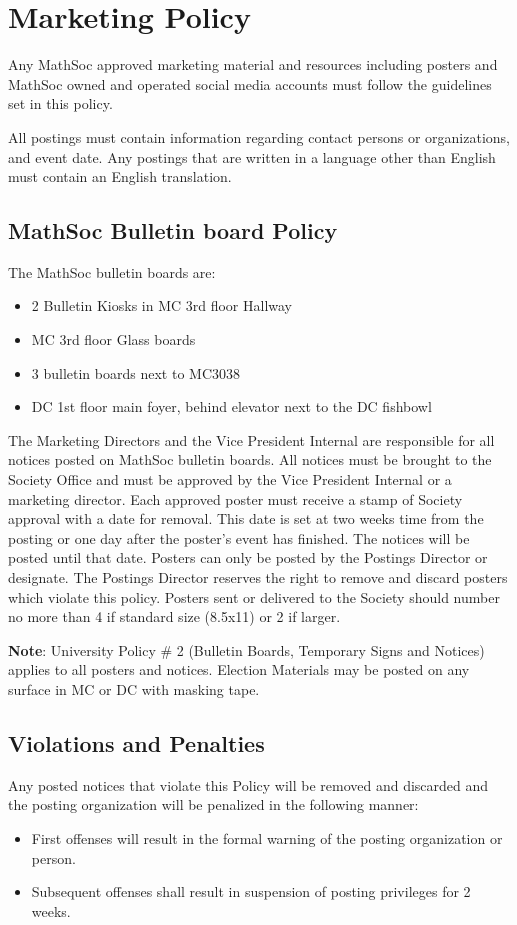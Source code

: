 \section{Marketing Policy}

Any MathSoc approved marketing material and resources including posters and MathSoc owned and operated social media accounts must follow the guidelines set in this policy. 

All postings must contain information regarding contact persons or organizations, and event date. Any  postings that are written in a language other than English must contain an English translation. 

\subsection{MathSoc Bulletin board Policy}

The MathSoc bulletin boards are: 
\begin{itemize}
    \item 2 Bulletin Kiosks in MC 3rd floor Hallway 
    \item MC 3rd floor Glass boards 
    \item 3 bulletin boards next to MC3038 
    \item DC 1st floor main foyer, behind elevator next to the DC fishbowl 
\end{itemize}

The Marketing Directors and the Vice President Internal are responsible for all notices posted on  MathSoc bulletin boards. 
All notices must be brought to the Society Office and must be approved by the  Vice President Internal or a marketing director. 
Each approved poster must receive a stamp of Society  approval with a date for removal. 
This date is set at two weeks time from the posting or one day after the  poster’s event has finished. 
The notices will be posted until that date. 
Posters can only be posted by the  Postings Director or designate. 
The Postings Director reserves the right to remove and discard posters  which violate this policy. 
Posters sent or delivered to the Society should number no more than 4 if  standard size (8.5x11) or 2 if larger. 

\textbf{Note}: University Policy # 2 (Bulletin Boards, Temporary Signs and Notices) applies to all posters and  notices. Election Materials may be posted on any surface in MC or DC with masking tape. 

\subsection{Violations and Penalties}

Any posted notices that violate this Policy will be removed and discarded and the posting organization  will be penalized in the following manner: 
\begin{itemize}
    \item First offenses will result in the formal warning of the posting organization or person.
    \item Subsequent offenses shall result in suspension of posting privileges for 2 weeks.
\end{itemize}